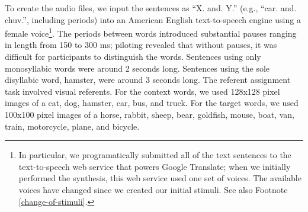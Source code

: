 \documentclass[man,floatsintext]{apa6}
\begin{document}
To create the audio files, we input the sentences as ``X. and. Y.'' (e.g., ``car. and. chuv.'', including periods) into an American English text-to-speech engine using a female voice\footnote{\label{tts}In particular, we programatically submitted all of the text sentences to the text-to-speech web service that powers Google Translate; when we initially performed the synthesis, this web service used one set of voices. The available voices have changed since we created our initial stimuli. See also Footnote \ref{change-of-stimuli}.}. The periods between words introduced substantial pauses ranging in length from 150 to 300 ms; piloting revealed that without pauses, it was difficult for participants to distinguish the words. Sentences using only monosyllabic words were around 2 seconds long. Sentences using the sole disyllabic word, hamster, were around 3 seconds long.  The referent assignment task involved visual referents. For the context words, we used 128x128 pixel images of a cat, dog, hamster, car, bus, and truck. For the target words, we used 100x100 pixel images of a horse, rabbit, sheep, bear, goldfish, mouse, boat, van, train, motorcycle, plane, and bicycle.
\end{document}
